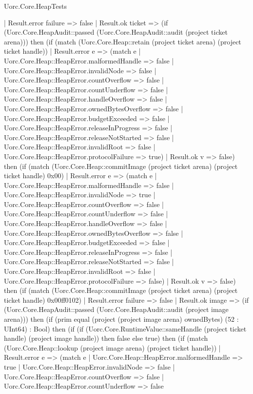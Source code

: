 \begin{lexlean}{Uorc.Core.HeapTests}
\begin{semanticmodule}
{    | Result.error failure => false
    | Result.ok ticket => (if (Uorc.Core.HeapAudit::passed (Uorc.Core.HeapAudit::audit (project ticket arena))) then (if (match (Uorc.Core.Heap::retain (project ticket arena) (project ticket handle))
      | Result.error e => (match e
        | Uorc.Core.Heap::HeapError.malformedHandle => false
        | Uorc.Core.Heap::HeapError.invalidNode => false
        | Uorc.Core.Heap::HeapError.countOverflow => false
        | Uorc.Core.Heap::HeapError.countUnderflow => false
        | Uorc.Core.Heap::HeapError.handleOverflow => false
        | Uorc.Core.Heap::HeapError.ownedBytesOverflow => false
        | Uorc.Core.Heap::HeapError.budgetExceeded => false
        | Uorc.Core.Heap::HeapError.releaseInProgress => false
        | Uorc.Core.Heap::HeapError.releaseNotStarted => false
        | Uorc.Core.Heap::HeapError.invalidRoot => false
        | Uorc.Core.Heap::HeapError.protocolFailure => true)
      | Result.ok v => false) then (if (match (Uorc.Core.Heap::commitImage (project ticket arena) (project ticket handle) 0x00)
      | Result.error e => (match e
        | Uorc.Core.Heap::HeapError.malformedHandle => false
        | Uorc.Core.Heap::HeapError.invalidNode => true
        | Uorc.Core.Heap::HeapError.countOverflow => false
        | Uorc.Core.Heap::HeapError.countUnderflow => false
        | Uorc.Core.Heap::HeapError.handleOverflow => false
        | Uorc.Core.Heap::HeapError.ownedBytesOverflow => false
        | Uorc.Core.Heap::HeapError.budgetExceeded => false
        | Uorc.Core.Heap::HeapError.releaseInProgress => false
        | Uorc.Core.Heap::HeapError.releaseNotStarted => false
        | Uorc.Core.Heap::HeapError.invalidRoot => false
        | Uorc.Core.Heap::HeapError.protocolFailure => false)
      | Result.ok v => false) then (if (match (Uorc.Core.Heap::commitImage (project ticket arena) (project ticket handle) 0x00ff0102)
      | Result.error failure => false
      | Result.ok image => (if (Uorc.Core.HeapAudit::passed (Uorc.Core.HeapAudit::audit (project image arena))) then (if (prim equal (project (project image arena) ownedBytes) (52 : UInt64) : Bool) then (if (if (Uorc.Core.RuntimeValue::sameHandle (project ticket handle) (project image handle)) then false else true) then (if (match (Uorc.Core.Heap::lookup (project image arena) (project ticket handle))
        | Result.error e => (match e
          | Uorc.Core.Heap::HeapError.malformedHandle => true
          | Uorc.Core.Heap::HeapError.invalidNode => false
          | Uorc.Core.Heap::HeapError.countOverflow => false
          | Uorc.Core.Heap::HeapError.countUnderflow => false
}
\end{semanticmodule}
\end{lexlean}
